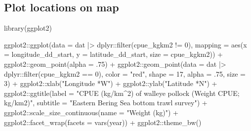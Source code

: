 \documentclass[
  letterpaper,
  oneside,
  open=any]{scrbook}
\newenvironment{Shaded}{\begin{snugshade}}{\end{snugshade}}
\newcommand{\AttributeTok}[1]{\textcolor[rgb]{0.40,0.45,0.13}{#1}}
\newcommand{\DecValTok}[1]{\textcolor[rgb]{0.68,0.00,0.00}{#1}}
\newcommand{\FunctionTok}[1]{\textcolor[rgb]{0.28,0.35,0.67}{#1}}
\newcommand{\NormalTok}[1]{\textcolor[rgb]{0.00,0.23,0.31}{#1}}
\newcommand{\SpecialCharTok}[1]{\textcolor[rgb]{0.37,0.37,0.37}{#1}}
\newcommand{\StringTok}[1]{\textcolor[rgb]{0.13,0.47,0.30}{#1}}
\begin{document}
\renewcommand*{\arraystretch}{1}

\subsection{Plot locations on map}\label{plot-locations-on-map}

\begin{Shaded}
\begin{Highlighting}[]
\FunctionTok{library}\NormalTok{(ggplot2)}

\NormalTok{ggplot2}\SpecialCharTok{::}\FunctionTok{ggplot}\NormalTok{(}\AttributeTok{data =}\NormalTok{ dat }\SpecialCharTok{|\textgreater{}}\NormalTok{ dplyr}\SpecialCharTok{::}\FunctionTok{filter}\NormalTok{(cpue\_kgkm2 }\SpecialCharTok{!=} \DecValTok{0}\NormalTok{), }
                \AttributeTok{mapping =} \FunctionTok{aes}\NormalTok{(}\AttributeTok{x =}\NormalTok{ longitude\_dd\_start, }
                              \AttributeTok{y =}\NormalTok{ latitude\_dd\_start, }
                              \AttributeTok{size =}\NormalTok{ cpue\_kgkm2)) }\SpecialCharTok{+} 
\NormalTok{  ggplot2}\SpecialCharTok{::}\FunctionTok{geom\_point}\NormalTok{(}\AttributeTok{alpha =}\NormalTok{ .}\DecValTok{75}\NormalTok{) }\SpecialCharTok{+}
\NormalTok{  ggplot2}\SpecialCharTok{::}\FunctionTok{geom\_point}\NormalTok{(}\AttributeTok{data =}\NormalTok{ dat }\SpecialCharTok{|\textgreater{}}\NormalTok{ dplyr}\SpecialCharTok{::}\FunctionTok{filter}\NormalTok{(cpue\_kgkm2 }\SpecialCharTok{==} \DecValTok{0}\NormalTok{), }
                      \AttributeTok{color =} \StringTok{"red"}\NormalTok{, }
                      \AttributeTok{shape =} \DecValTok{17}\NormalTok{,}
                      \AttributeTok{alpha =}\NormalTok{ .}\DecValTok{75}\NormalTok{,}
                      \AttributeTok{size =} \DecValTok{3}\NormalTok{) }\SpecialCharTok{+}
\NormalTok{  ggplot2}\SpecialCharTok{::}\FunctionTok{xlab}\NormalTok{(}\StringTok{"Longitude *W"}\NormalTok{) }\SpecialCharTok{+}
\NormalTok{  ggplot2}\SpecialCharTok{::}\FunctionTok{ylab}\NormalTok{(}\StringTok{"Latitude *N"}\NormalTok{) }\SpecialCharTok{+}
\NormalTok{  ggplot2}\SpecialCharTok{::}\FunctionTok{ggtitle}\NormalTok{(}\AttributeTok{label =} \StringTok{"CPUE (kg/km\^{}2) of walleye pollock (Weight CPUE; kg/km2)"}\NormalTok{, }
                   \AttributeTok{subtitle =} \StringTok{"Eastern Bering Sea bottom trawl survey"}\NormalTok{) }\SpecialCharTok{+}
\NormalTok{  ggplot2}\SpecialCharTok{::}\FunctionTok{scale\_size\_continuous}\NormalTok{(}\AttributeTok{name =} \StringTok{"Weight (kg)"}\NormalTok{) }\SpecialCharTok{+} 
\NormalTok{  ggplot2}\SpecialCharTok{::}\FunctionTok{facet\_wrap}\NormalTok{(}\AttributeTok{facets =} \FunctionTok{vars}\NormalTok{(year)) }\SpecialCharTok{+} 
\NormalTok{  ggplot2}\SpecialCharTok{::}\FunctionTok{theme\_bw}\NormalTok{()}
\end{Highlighting}
\end{Shaded}
\end{document}
